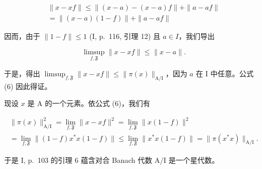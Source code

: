 \[
\begin{array}{c} \| x - x f \| \leqslant \| (x - a) - (x - a) f \| + \| a - a f \| \\ = \| (x - a) (1 - f) \| + \| a - a f \| \end{array}
\]

因而，由于 \(\|1 - f\| \leqslant 1\) (I, p.~116, 引理 12) 且 \(a \in I\)，我们导出

\[
\operatorname * {l i m s u p} _ {f, \mathfrak {F}} \| x - x f \| \leqslant \| x - a \|.
\]

于是，得出 \(\limsup_{f,\mathfrak{F}} \|x - xf\| \leqslant \|\pi(x)\|_{\mathrm{A/I}}\)，因为 \(a\) 在 I 中任意。公式 (6) 因此得证。

现设 \(x\) 是 A 的一个元素。依公式 (6)，我们有

\[
\begin{array}{c} \| \pi (x) \| _ {\mathrm{A/I}} ^ {2} = \lim _ {f, \mathfrak {F}} \| x - x f \| ^ {2} = \lim _ {f, \mathfrak {F}} \| x (1 - f) \| ^ {2} \\ = \lim _ {f, \mathfrak {F}} \| (1 - f) x ^ {*} x (1 - f) \| \leqslant \lim _ {f, \mathfrak {F}} \| x ^ {*} x (1 - f) \| = \| \pi (x ^ {*} x) \| _ {\mathrm{A/I}}. \end{array}
\]

于是 I, p.~103 的引理 6 蕴含对合 Banach 代数 A/I 是一个星代数。

